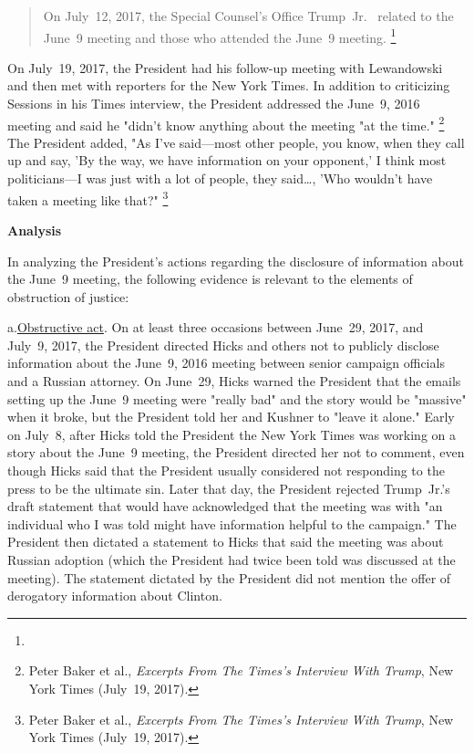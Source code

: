 \begin{quote}
On July~12, 2017, the Special Counsel's Office  Trump~Jr.\
 related to the June~9 meeting and those who attended the June~9 meeting.%
\footnote{\blackout{Grand Jury}}
\end{quote}

On July~19, 2017, the President had his follow-up meeting with Lewandowski and then met with reporters for the New York Times.
In addition to criticizing Sessions in his Times interview, the President addressed the June~9, 2016 meeting and said he "didn't know anything about the meeting "at the time."%
\footnote{Peter Baker et al., \textit{Excerpts From The Times's Interview With Trump}, New York Times (July~19, 2017).}
The President added, "As I've said---most other people, you know, when they call up and say, 'By the way, we have information on your opponent,' I think most politicians---I was just with a lot of people, they said\dots,
'Who wouldn't have taken a meeting like that?"%
\footnote{Peter Baker et al., \textit{Excerpts From The Times's Interview With Trump}, New York Times (July~19, 2017).}

\begin{center}
\textbf{Analysis}
\end{center}

In analyzing the President's actions regarding the disclosure of information about the June~9 meeting, the following evidence is relevant to the elements of obstruction of justice:

a.\qquad\underline{Obstructive act}.
On at least three occasions between June~29, 2017, and July~9, 2017, the President directed Hicks and others not to publicly disclose information about the June~9, 2016 meeting between senior campaign officials and a Russian attorney.
On June~29, Hicks warned the President that the emails setting up the June~9 meeting were "really bad" and the story would be "massive" when it broke, but the President told her and Kushner to "leave it alone."
Early on July~8, after Hicks told the President the New York Times was working on a story about the June~9 meeting, the President directed her not to comment, even though Hicks said that the President usually considered not responding to the press to be the ultimate sin.
Later that day, the President rejected Trump~Jr.'s draft statement that would have acknowledged that the meeting was with "an individual who I was told might have information helpful to the campaign." The President then dictated a statement to Hicks that said the meeting was about Russian adoption (which the President had twice been told was discussed at the meeting).
The statement dictated by the President did not mention the offer of derogatory information about Clinton.

